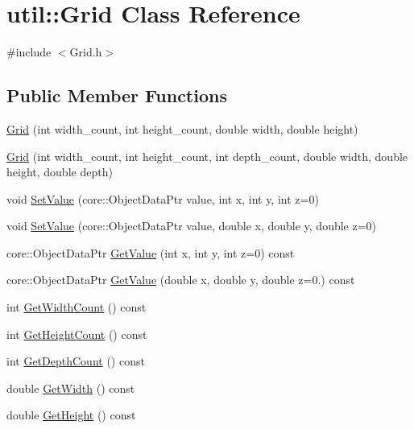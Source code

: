 \hypertarget{classutil_1_1Grid}{}\section{util\+:\+:Grid Class Reference}
\label{classutil_1_1Grid}


{\ttfamily \#include $<$Grid.\+h$>$}

\subsection*{Public Member Functions}
\begin{DoxyCompactItemize}
\item 
\hyperlink{classutil_1_1Grid_a0b2bfd0044eb5633a3f1121e5e70709e}{Grid} (int width\+\_\+count, int height\+\_\+count, double width, double height)
\item 
\hyperlink{classutil_1_1Grid_ad6457dda588e20ccd503e363e96dd57e}{Grid} (int width\+\_\+count, int height\+\_\+count, int depth\+\_\+count, double width, double height, double depth)
\item 
void \hyperlink{classutil_1_1Grid_a0e93bd63922e7cbe405176a1ae21877e}{Set\+Value} (core\+::\+Object\+Data\+Ptr value, int x, int y, int z=0)
\item 
void \hyperlink{classutil_1_1Grid_ad7dbf79146d9f5ae1662910b82fd25ea}{Set\+Value} (core\+::\+Object\+Data\+Ptr value, double x, double y, double z=0)
\item 
core\+::\+Object\+Data\+Ptr \hyperlink{classutil_1_1Grid_a6658334ae9b505c56b75f6f15434832e}{Get\+Value} (int x, int y, int z=0) const
\item 
core\+::\+Object\+Data\+Ptr \hyperlink{classutil_1_1Grid_a6cc6449dfe16dde11035fe2d16a321cd}{Get\+Value} (double x, double y, double z=0.) const
\item 
int \hyperlink{classutil_1_1Grid_a3f5cdd325b3e3eb30ca5d38bd31d005e}{Get\+Width\+Count} () const
\item 
int \hyperlink{classutil_1_1Grid_a0c63eb86e4be8c63e996ff61c3ef8b7f}{Get\+Height\+Count} () const
\item 
int \hyperlink{classutil_1_1Grid_a04f1c2fe745d469e49cf2523fe0f34fd}{Get\+Depth\+Count} () const
\item 
double \hyperlink{classutil_1_1Grid_a8b4dc63bee5859cae315969e039b4cac}{Get\+Width} () const
\item 
double \hyperlink{classutil_1_1Grid_a2d02a1eafe76faaa7e0f63ce406d782f}{Get\+Height} () const
\item 

\end{DoxyCompactItemize}
